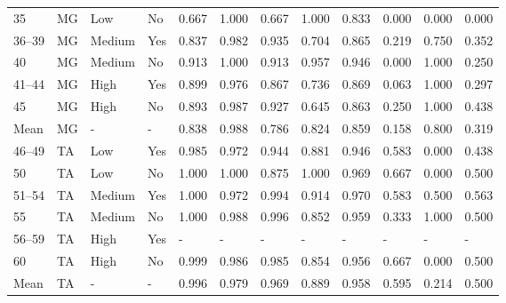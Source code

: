 \documentclass[11pt]{article}
\begin{document}
\begin{table}[htbp]
{\begin{tabular}{l|l|l|l|l|l|l|l|l|l|l|l}
35 & MG & Low & No & 0.667 & 1.000 & 0.667 & 1.000 & 0.833 & 0.000 & 0.000 & 0.000 \\
36–39 & MG & Medium & Yes & 0.837 & 0.982 & 0.935 & 0.704 & 0.865 & 0.219 & 0.750 & 0.352 \\
40 & MG & Medium & No & 0.913 & 1.000 & 0.913 & 0.957 & 0.946 & 0.000 & 1.000 & 0.250 \\
41–44 & MG & High & Yes & 0.899 & 0.976 & 0.867 & 0.736 & 0.869 & 0.063 & 1.000 & 0.297 \\
45 & MG & High & No & 0.893 & 0.987 & 0.927 & 0.645 & 0.863 & 0.250 & 1.000 & 0.438 \\
\midrule
Mean & MG & - & - & 0.838 & 0.988 & 0.786 & 0.824 & 0.859 & 0.158 & 0.800 & 0.319 \\
\midrule
46–49 & TA & Low & Yes & 0.985 & 0.972 & 0.944 & 0.881 & 0.946 & 0.583 & 0.000 & 0.438 \\
50 & TA & Low & No & 1.000 & 1.000 & 0.875 & 1.000 & 0.969 & 0.667 & 0.000 & 0.500 \\
51–54 & TA & Medium & Yes & 1.000 & 0.972 & 0.994 & 0.914 & 0.970 & 0.583 & 0.500 & 0.563 \\
55 & TA & Medium & No & 1.000 & 0.988 & 0.996 & 0.852 & 0.959 & 0.333 & 1.000 & 0.500 \\
56–59 & TA & High & Yes & - & - & - & - & - & - & - & - \\
60 & TA & High & No & 0.999 & 0.986 & 0.985 & 0.854 & 0.956 & 0.667 & 0.000 & 0.500 \\
\midrule
Mean & TA & - & - & 0.996 & 0.979 & 0.969 & 0.889 & 0.958 & 0.595 & 0.214 & 0.500 \\ \bottomrule
\end{tabular}
}
\end{table}
\end{document}
